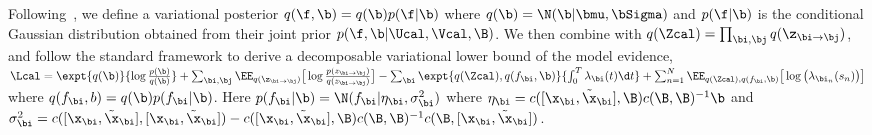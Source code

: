 Following~\citep{hensman2013gaussian}, we define a variational posterior $q(\f,\b) = q(\b) p(\f|\b)$ where $q(\b) = \N(\b|\bmu, \bSigma)$ and $p(\f|\b)$ is the conditional Gaussian distribution obtained from their joint prior $p(\f, \b|\Ucal, \Vcal, \B)$. We then combine with $q(\Zcal) = \prod_{\bi, \bj} q(\z_{\bi\rightarrow \bj})$, and follow the standard framework to derive a decomposable variational lower bound of the model evidence, 
$\Lcal = \expt{q(\b)}{\log\frac{p(\b)}{q(\b)}} + \sum_{\bi, \bj} \EE_{q(\z_{\bi \rightarrow \bj})} \big[\log\frac{p(z_{\bi \rightarrow \bj})}{q(z_{\bi \rightarrow \bj})}\big]  -\sum_{\bi}\expt{q(\Zcal), q(f_\bi, \b)}{\int_{0}^T \lambda_\bi(t) \d t} + \sum_{n=1}^N \EE_{q(\Zcal), q(f_\bi, \b)} \big[\log\big(\lambda_{\bi_n}(s_n)\big)\big]$
where $q(f_\bi, b) = q(\b)p(f_\bi|\b)$. Here $p(f_\bi|\b) = \N(f_\bi|\eta_\bi,  \sigma^2_\bi)$
where $\eta_\bi = c([\x_\bi, \tilde{\x}_\bi], \B)c(\B,\B)^{-1}\b$ and $\sigma_\bi^2 = c([\x_\bi, \tilde{\x}_\bi], [\x_\bi, \tilde{\x}_\bi]) - c([\x_\bi, \tilde{\x}_\bi], \B)c(\B,\B)^{-1}c(\B, [\x_\bi, \tilde{\x}_\bi])$.

